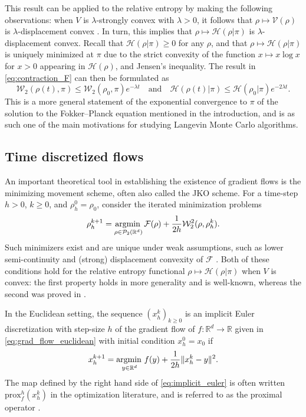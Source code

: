 \documentclass[final,12pt]{colt2018}
\newcommand{\was}{\mathcal{W}}
\newcommand{\argmin}{\operatornamewithlimits{argmin\,}}
\newcommand{\prox}{\text{prox}}
\begin{document}
This result can be applied to the relative entropy by making the following observations: when $V$ is $\lambda$-strongly convex with $\lambda > 0$, it follows that $\rho\mapsto\mathcal{V}(\rho)$ is $\lambda$-displacement convex \citep[Proposition 9.3.2]{ambrosio2005}. In turn, this implies that $\rho\mapsto \mathcal{H}(\rho | \pi)$ is $\lambda$-displacement convex. Recall that $\mathcal{H}(\rho | \pi) \geq 0$ for any $\rho$, and that $\rho \mapsto \mathcal{H}(\rho | \pi)$ is uniquely minimized at $\pi$ due to the strict convexity of the function $x \mapsto x \log x$ for $x > 0$ appearing in $\mathcal{H}(\rho)$, and Jensen's inequality. The result in \eqref{eq:contraction_F} can then be formulated as
\begin{equation}\label{eq:contraction}
\was_2(\rho(t),\pi) \leq \was_2(\rho_0,\pi)e^{-\lambda t} \quad \text{and}\quad \mathcal{H}(\rho(t) | \pi) \leq \mathcal{H}(\rho_0 | \pi)e^{-2\lambda t}.
\end{equation}
This is a more general statement of the exponential convergence to $\pi$ of the solution to the Fokker--Planck equation mentioned in the introduction, and is as such one of the main motivations for studying Langevin Monte Carlo algorithms.


\subsection{Time discretized flows}
An important theoretical tool in establishing the existence of  gradient flows is the minimizing movement scheme, often also called the JKO scheme. For a time-step $h>0$, $k \geq 0$, and $\rho_h^0 = \rho_0$, consider the iterated minimization problems
\begin{equation}\label{eq:jko}
\rho_h^{k+1} = \argmin_{\rho \in \mathcal{P}_2(\mathbb{R}^d)} \mathcal{F}(\rho) + \frac{1}{2h}\was_2^2(\rho,\rho_h^k).
\end{equation}
Such minimizers exist and are unique under weak assumptions, such as lower semi-continuity and (strong) displacement convexity of $\mathcal{F}$ \citep[see e.g.][Proposition 4.2]{ambrosio2009existence}. Both of these conditions hold for the relative entropy functional $\rho\mapsto \mathcal H( \rho | \pi)$ when $V$ is convex: the first property holds in more generality and is well-known, whereas the second was proved in \citet{mccann1997convexity}. 

In the Euclidean setting, the sequence $(x_h^k)_{k\geq 0}$ is an implicit Euler discretization with step-size $h$ of the gradient flow of $f:\mathbb{R}^d \to \mathbb{R}$ given in \eqref{eq:grad_flow_euclidean} with initial condition $x_h^0 = x_0$ if 
\begin{equation}\label{eq:implicit_euler}
x_h^{k+1} = \argmin_{y \in \mathbb{R}^d} f(y) + \frac{1}{2h}\|x_h^{k}-y\|^2.
\end{equation}
The map defined by the right hand side of \eqref{eq:implicit_euler} is often written $\prox_f^h(x_h^k)$ in the optimization literature, and is referred to as the proximal operator \citep[see e.g.][]{parikh2014proximal}.
\end{document}
